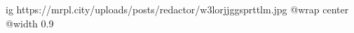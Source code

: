  
 
 
 
 

\ifcmt
  ig https://mrpl.city/uploads/posts/redactor/w3lorjjggsprttlm.jpg
  @wrap center
  @width 0.9
\fi
